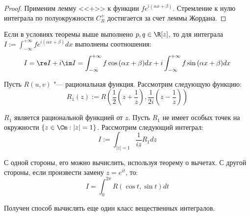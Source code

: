 \begin{proof}
	Применим лемму <<$+$>> к функции $fe^{i(\alpha x + \beta)}$. Стремление к нулю интеграла по полуокружности $C_R^+$ достигается за счет леммы Жордана.
\end{proof}

\begin{note}
	Если в условиях теоремы выше выполнено $p, q \in \R[z]$, то для интеграла $I := \int_{-\infty}^{+\infty}fe^{i(\alpha x + \beta)}dx$ выполнены соотношения:
	\[I = \re I + i \im I = \int_{-\infty}^{+\infty}f\cos{(\alpha x + \beta)}dx + i\int_{-\infty}^{+\infty}f\sin{(\alpha x + \beta)}dx\]
\end{note}

\begin{note}
	Пусть $R(u, v)$ "--- рациональная функция. Рассмотрим следующую функцию:
	\[R_1(z) := R\left(\frac12\left(z + \frac1z\right), \frac1{2i}\left(z - \frac1z\right)\right)\]
	
	$R_1$ является рациональной функцией от $z$. Пусть $R_1$ не имеет особых точек на окружности $\{z \in \Cm : |z| = 1\}$. Рассмотрим следующий интеграл:
	\[I := \int_{|z| = 1}\frac{1}{iz}R_1dz\]
	
	С одной стороны, его можно вычислить, используя теорему о вычетах. С другой стороны, если произвести замену $z = e^{it}$, то:
	\[I = \int_{0}^{2\pi} R(\cos{t}, \sin{t})dt\]
	
	Получен способ вычислять еще один класс вещественных интегралов.
\end{note}